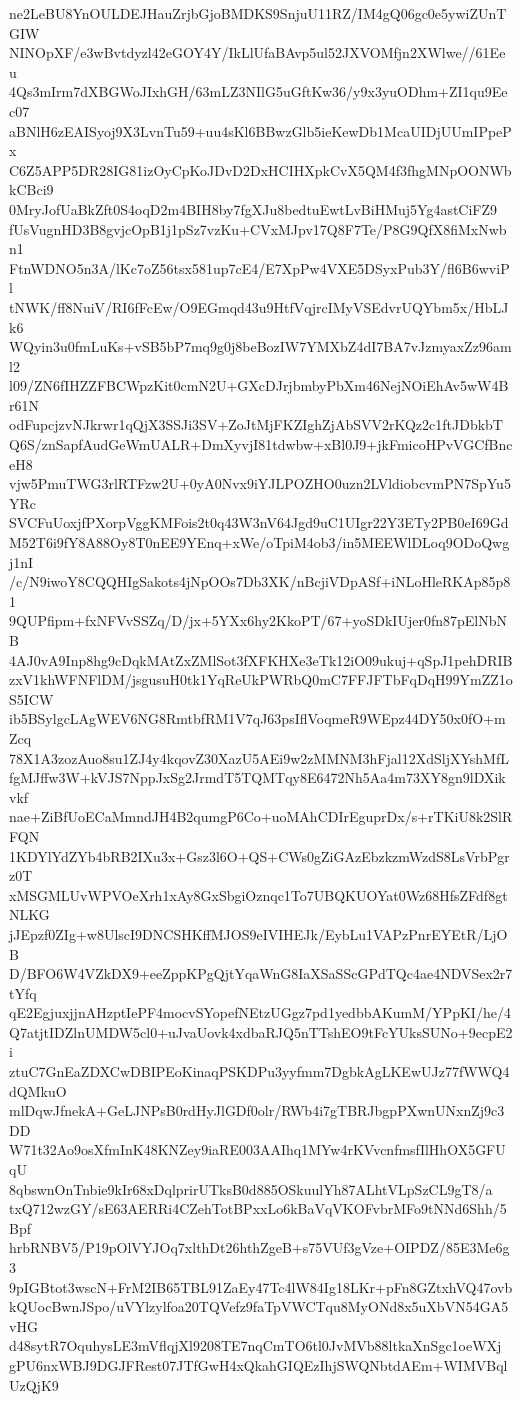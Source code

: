 ne2LeBU8YnOULDEJHauZrjbGjoBMDKS9SnjuU11RZ/IM4gQ06gc0e5ywiZUnTGIW
NINOpXF/e3wBvtdyzl42eGOY4Y/IkLlUfaBAvp5ul52JXVOMfjn2XWlwe//61Eeu
4Qs3mIrm7dXBGWoJIxhGH/63mLZ3NIlG5uGftKw36/y9x3yuODhm+ZI1qu9Eec07
aBNlH6zEAISyoj9X3LvnTu59+uu4sKl6BBwzGlb5ieKewDb1McaUIDjUUmIPpePx
C6Z5APP5DR28IG81izOyCpKoJDvD2DxHCIHXpkCvX5QM4f3fhgMNpOONWbkCBci9
0MryJofUaBkZft0S4oqD2m4BIH8by7fgXJu8bedtuEwtLvBiHMuj5Yg4astCiFZ9
fUsVugnHD3B8gvjcOpB1j1pSz7vzKu+CVxMJpv17Q8F7Te/P8G9QfX8fiMxNwbn1
FtnWDNO5n3A/lKc7oZ56tsx581up7cE4/E7XpPw4VXE5DSyxPub3Y/fl6B6wviPl
tNWK/ff8NuiV/RI6fFcEw/O9EGmqd43u9HtfVqjrcIMyVSEdvrUQYbm5x/HbLJk6
WQyin3u0fmLuKs+vSB5bP7mq9g0j8beBozIW7YMXbZ4dI7BA7vJzmyaxZz96aml2
l09/ZN6fIHZZFBCWpzKit0cmN2U+GXcDJrjbmbyPbXm46NejNOiEhAv5wW4Br61N
odFupcjzvNJkrwr1qQjX3SSJi3SV+ZoJtMjFKZIghZjAbSVV2rKQz2c1ftJDbkbT
Q6S/znSapfAudGeWmUALR+DmXyvjI81tdwbw+xBl0J9+jkFmicoHPvVGCfBnceH8
vjw5PmuTWG3rlRTFzw2U+0yA0Nvx9iYJLPOZHO0uzn2LVldiobcvmPN7SpYu5YRc
SVCFuUoxjfPXorpVggKMFois2t0q43W3nV64Jgd9uC1UIgr22Y3ETy2PB0eI69Gd
M52T6i9fY8A88Oy8T0nEE9YEnq+xWe/oTpiM4ob3/in5MEEWlDLoq9ODoQwgj1nI
/c/N9iwoY8CQQHIgSakots4jNpOOs7Db3XK/nBcjiVDpASf+iNLoHleRKAp85p81
9QUPfipm+fxNFVvSSZq/D/jx+5YXx6hy2KkoPT/67+yoSDkIUjer0fn87pElNbNB
4AJ0vA9Inp8hg9cDqkMAtZxZMlSot3fXFKHXe3eTk12iO09ukuj+qSpJ1pehDRIB
zxV1khWFNFlDM/jsgusuH0tk1YqReUkPWRbQ0mC7FFJFTbFqDqH99YmZZ1oS5ICW
ib5BSylgcLAgWEV6NG8RmtbfRM1V7qJ63psIflVoqmeR9WEpz44DY50x0fO+mZcq
78X1A3zozAuo8su1ZJ4y4kqovZ30XazU5AEi9w2zMMNM3hFjal12XdSljXYshMfL
fgMJffw3W+kVJS7NppJxSg2JrmdT5TQMTqy8E6472Nh5Aa4m73XY8gn9lDXikvkf
nae+ZiBfUoECaMmndJH4B2qumgP6Co+uoMAhCDIrEguprDx/s+rTKiU8k2SlRFQN
1KDYlYdZYb4bRB2IXu3x+Gsz3l6O+QS+CWs0gZiGAzEbzkzmWzdS8LsVrbPgrz0T
xMSGMLUvWPVOeXrh1xAy8GxSbgiOznqc1To7UBQKUOYat0Wz68HfsZFdf8gtNLKG
jJEpzf0ZIg+w8UlscI9DNCSHKffMJOS9eIVIHEJk/EybLu1VAPzPnrEYEtR/LjOB
D/BFO6W4VZkDX9+eeZppKPgQjtYqaWnG8IaXSaSScGPdTQc4ae4NDVSex2r7tYfq
qE2EgjuxjjnAHzptIePF4mocvSYopefNEtzUGgz7pd1yedbbAKumM/YPpKI/he/4
Q7atjtIDZlnUMDW5cl0+uJvaUovk4xdbaRJQ5nTTshEO9tFcYUksSUNo+9ecpE2i
ztuC7GnEaZDXCwDBIPEoKinaqPSKDPu3yyfmm7DgbkAgLKEwUJz77fWWQ4dQMkuO
mlDqwJfnekA+GeLJNPsB0rdHyJlGDf0olr/RWb4i7gTBRJbgpPXwnUNxnZj9c3DD
W71t32Ao9osXfmInK48KNZey9iaRE003AAIhq1MYw4rKVvcnfmsfIlHhOX5GFUqU
8qbswnOnTnbie9kIr68xDqlprirUTksB0d885OSkuulYh87ALhtVLpSzCL9gT8/a
txQ712wzGY/sE63AERRi4CZehTotBPxxLo6kBaVqVKOFvbrMFo9tNNd6Shh/5Bpf
hrbRNBV5/P19pOlVYJOq7xlthDt26hthZgeB+s75VUf3gVze+OIPDZ/85E3Me6g3
9pIGBtot3wscN+FrM2IB65TBL91ZaEy47Tc4lW84Ig18LKr+pFn8GZtxhVQ47ovb
kQUocBwnJSpo/uVYlzylfoa20TQVefz9faTpVWCTqu8MyONd8x5uXbVN54GA5vHG
d48sytR7OquhysLE3mVflqjXl9208TE7nqCmTO6tl0JvMVb88ltkaXnSgc1oeWXj
gPU6nxWBJ9DGJFRest07JTfGwH4xQkahGIQEzIhjSWQNbtdAEm+WIMVBqlUzQjK9
